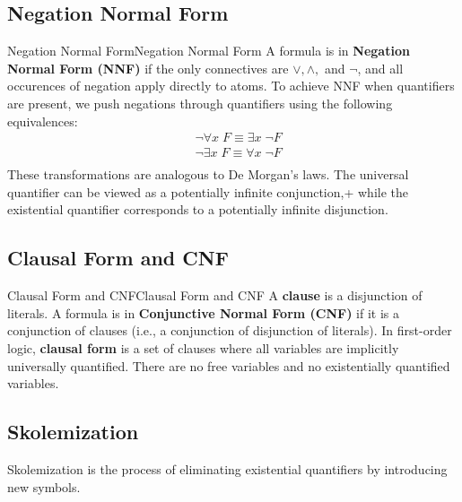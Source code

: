 \documentclass[a4paper]{article}
\theoremstyle{definition}
\begin{document}
\subsection{Negation Normal Form}
\begin{definition}{Negation Normal Form}{Negation Normal Form}
A formula is in \textbf{Negation Normal Form (NNF)} if the only connectives are \( \vee, \wedge, \) and \( \lnot \), and all occurences 
of negation apply directly to atoms.
\vspace{1em}
\noindent 
\newline
To achieve NNF when quantifiers are present, we push negations through quantifiers using the following equivalences:
\begin{align*}
	& \lnot \forall x\; F \equiv \exists x\; \lnot F \\
	& \lnot \exists x\; F \equiv \forall x\; \lnot F \\
\end{align*}
These transformations are analogous to De Morgan's laws. The universal quantifier can be viewed as a potentially infinite conjunction,+
while the existential quantifier corresponds to a potentially infinite disjunction.
\end{definition}
\subsection{Clausal Form and CNF}
\begin{definition}{Clausal Form and CNF}{Clausal Form and CNF}
A \textbf{clause} is a disjunction of literals. A formula is in \textbf{Conjunctive Normal Form (CNF)} if it is a 
conjunction of clauses (i.e., a conjunction of disjunction of literals). In first-order logic, \textbf{clausal form} is 
a set of clauses where all variables are implicitly universally quantified. There are no free variables and no 
existentially quantified variables.
\end{definition}
\subsection{Skolemization}
Skolemization is the process of eliminating existential quantifiers by introducing new symbols.
\end{document}

